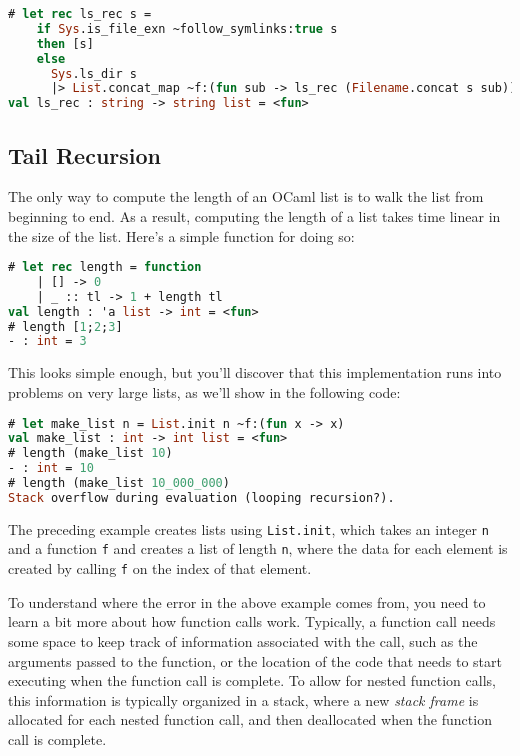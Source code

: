 \begin{lstlisting}[language=Caml]
# let rec ls_rec s =
    if Sys.is_file_exn ~follow_symlinks:true s
    then [s]
    else
      Sys.ls_dir s
      |> List.concat_map ~f:(fun sub -> ls_rec (Filename.concat s sub))
val ls_rec : string -> string list = <fun>
\end{lstlisting}

\hypertarget{tail-recursion}{%
\subsection{Tail Recursion}\label{tail-recursion}}

The only way to compute the length of an OCaml list is to walk the list
from beginning to end. As a result, computing the length of a list takes
time linear in the size of the list. Here's a simple function for doing
so:

\begin{lstlisting}[language=Caml]
# let rec length = function
    | [] -> 0
    | _ :: tl -> 1 + length tl
val length : 'a list -> int = <fun>
# length [1;2;3]
- : int = 3
\end{lstlisting}

This looks simple enough, but you'll discover that this implementation
runs into problems on very large lists, as we'll show in the following
code:

\begin{lstlisting}[language=Caml]
# let make_list n = List.init n ~f:(fun x -> x)
val make_list : int -> int list = <fun>
# length (make_list 10)
- : int = 10
# length (make_list 10_000_000)
Stack overflow during evaluation (looping recursion?).
\end{lstlisting}

The preceding example creates lists using
\passthrough{\lstinline!List.init!}, which takes an integer
\passthrough{\lstinline!n!} and a function \passthrough{\lstinline!f!}
and creates a list of length \passthrough{\lstinline!n!}, where the data
for each element is created by calling \passthrough{\lstinline!f!} on
the index of that element.

To understand where the error in the above example comes from, you need
to learn a bit more about how function calls work. Typically, a function
call needs some space to keep track of information associated with the
call, such as the arguments passed to the function, or the location of
the code that needs to start executing when the function call is
complete. To allow for nested function calls, this information is
typically organized in a stack, where a new \emph{stack frame} is
allocated for each nested function call, and then deallocated when the
function call is complete.


